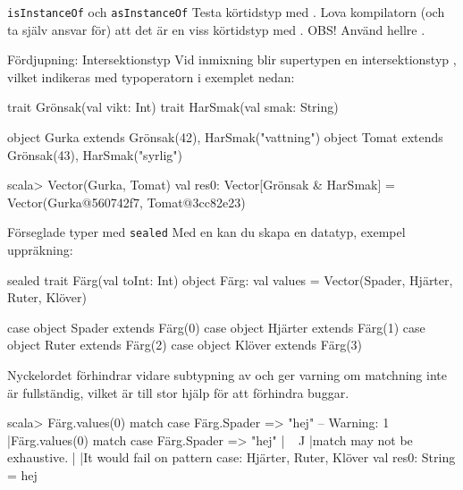 \begin{Slide}{\texttt{isInstanceOf} och \texttt{asInstanceOf}}\SlideFontTiny
Testa körtidstyp med . Lova kompilatorn (och ta själv ansvar för) att det är en viss körtidstyp med . OBS! Använd hellre .
\end{Slide}


\begin{Slide}{Fördjupning: Intersektionstyp}\SlideFontSmall
Vid inmixning blir supertypen en intersektionstyp , vilket indikeras med typoperatorn \code{&} i exemplet nedan:
\begin{Code}
trait Grönsak(val vikt: Int)
trait HarSmak(val smak: String)

object Gurka extends Grönsak(42), HarSmak("vattning")
object Tomat extends Grönsak(43), HarSmak("syrlig")
\end{Code} 
\begin{REPLnonum}
scala> Vector(Gurka, Tomat)
val res0: Vector[Grönsak & HarSmak] = 
  Vector(Gurka@560742f7, Tomat@3cc82e23)
\end{REPLnonum}
\end{Slide}



\begin{Slide}{Förseglade typer med \texttt{sealed}}\SlideFontSmall
Med en  kan du skapa en  datatyp, exempel uppräkning:
\begin{Code}
sealed trait Färg(val toInt: Int)
object Färg:
  val values = Vector(Spader, Hjärter, Ruter, Klöver)
  
  case object Spader  extends Färg(0)
  case object Hjärter extends Färg(1)
  case object Ruter   extends Färg(2)
  case object Klöver  extends Färg(3)
\end{Code}
Nyckelordet  förhindrar vidare subtypning av  och ger varning om matchning inte är fullständig, vilket är till stor hjälp för att förhindra buggar.

\begin{REPL}
scala> Färg.values(0) match { case Färg.Spader => "hej" }
-- Warning:
1 |Färg.values(0) match { case Färg.Spader => "hej" }
  |^^^^^^^^^^^^^^
  |match may not be exhaustive.
  |
  |It would fail on pattern case: Hjärter, Ruter, Klöver
val res0: String = hej
\end{REPL}
\end{Slide}
  
